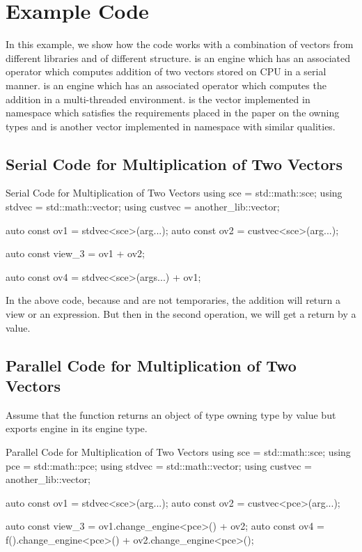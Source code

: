 \documentclass[oneside,11pt,a4paper]{jbarticle}
\begin{document}
\section{Example Code}
In this example, we show how the code works with a combination of vectors from
different libraries and of different structure.  is an engine
which has an associated operator  which computes addition
of two vectors stored on CPU in a serial manner.  is an engine
which has an associated operator  which computes the
addition in a multi-threaded environment.  is the
vector implemented in  namespace which satisfies the
requirements placed in the paper on the owning types and
 is another vector implemented in
 namespace with similar qualities.

\subsection{Serial Code for Multiplication of Two Vectors}
\begin{codecpp}{Serial Code for Multiplication of Two Vectors}
  using sce = std::math::sce;
  using stdvec = std::math::vector;
  using custvec = another_lib::vector;

  auto const ov1 = stdvec<sce>(arg...);
  auto const ov2 = custvec<sce>(arg...);

  auto const view_3 = ov1 + ov2;

  auto const ov4 = stdvec<sce>(args...) + ov1;
\end{codecpp}

In the above code, because  and  are not
temporaries, the addition will return a view or an expression. But then in the
second operation, we will get a return by a value.

\subsection{Parallel Code for Multiplication of Two Vectors}
Assume that the function  returns an object of type owning type
by value but exports engine  in its engine type.
\begin{codecpp}{Parallel Code for Multiplication of Two Vectors}
  using sce = std::math::sce;
  using pce = std::math::pce;
  using stdvec = std::math::vector;
  using custvec = another_lib::vector;

  auto const ov1 = stdvec<sce>(arg...);
  auto const ov2 = custvec<pce>(arg...);

  auto const view_3 = ov1.change_engine<pce>() + ov2;
  auto const ov4 = f().change_engine<pce>() + ov2.change_engine<pce>();
\end{codecpp}
\end{document}
